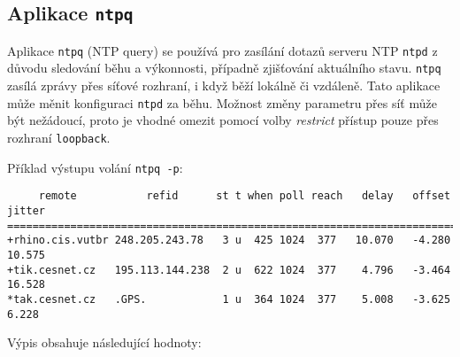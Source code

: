 \subsection{Aplikace {\tt ntpq}}\label{sec:ntpq}

Aplikace {\tt ntpq} (NTP query) se používá pro zasílání dotazů serveru NTP {\tt ntpd} z důvodu sledování běhu a výkonnosti, případně zjišťování aktuálního stavu. {\tt ntpq} zasílá zprávy přes síťové rozhraní, i když běží lokálně či vzdáleně. Tato aplikace může měnit konfiguraci {\tt ntpd} za běhu. Možnost změny parametru přes síť může být nežádoucí, proto je vhodné omezit pomocí volby {\em restrict} přístup pouze přes rozhraní {\tt loopback}. 

Příklad výstupu volání {\tt ntpq -p}:

\begin{verbatim}
     remote           refid      st t when poll reach   delay   offset  jitter
==============================================================================
+rhino.cis.vutbr 248.205.243.78   3 u  425 1024  377   10.070   -4.280  10.575
+tik.cesnet.cz   195.113.144.238  2 u  622 1024  377    4.796   -3.464  16.528
*tak.cesnet.cz   .GPS.            1 u  364 1024  377    5.008   -3.625   6.228
\end{verbatim}

Výpis obsahuje následující hodnoty:

